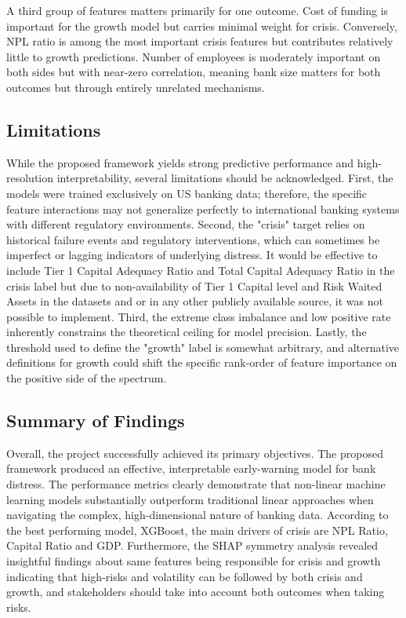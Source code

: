 \documentclass[conference]{IEEEtran}
\begin{document}
A third group of features matters primarily for one outcome. Cost of funding is important for the growth model but carries minimal weight for crisis. Conversely, NPL ratio is among the most important crisis features but contributes relatively little to growth predictions. Number of employees is moderately important on both sides but with near-zero correlation, meaning bank size matters for both outcomes but through entirely unrelated mechanisms.


\subsection{Limitations}
While the proposed framework yields strong predictive performance and high-resolution interpretability, several limitations should be acknowledged. First, the models were trained exclusively on US banking data; therefore, the specific feature interactions may not generalize perfectly to international banking systems with different regulatory environments. Second, the "crisis" target relies on historical failure events and regulatory interventions, which can sometimes be imperfect or lagging indicators of underlying distress. It would be effective to include Tier 1 Capital Adequacy Ratio and Total Capital Adequacy Ratio in the crisis label but due to non-availability of Tier 1 Capital level and Risk Waited Assets in the datasets and or in any other publicly available source, it was not possible to implement. Third, the extreme class imbalance and low positive rate inherently constrains the theoretical ceiling for model precision. Lastly, the threshold used to define the "growth" label is somewhat arbitrary, and alternative definitions for growth could shift the specific rank-order of feature importance on the positive side of the spectrum.

\subsection{Summary of Findings}
Overall, the project successfully achieved its primary objectives. The proposed framework produced an effective, interpretable early-warning model for bank distress. The performance metrics clearly demonstrate that non-linear machine learning models substantially outperform traditional linear approaches when navigating the complex, high-dimensional nature of banking data. According to the best performing model, XGBoost, the main drivers of crisis are NPL Ratio, Capital Ratio and GDP. Furthermore, the SHAP symmetry analysis revealed insightful findings about same features being responsible for crisis and growth indicating that high-risks and volatility can be followed by both crisis and growth, and stakeholders should take into account both outcomes when taking risks. 
\end{document}
